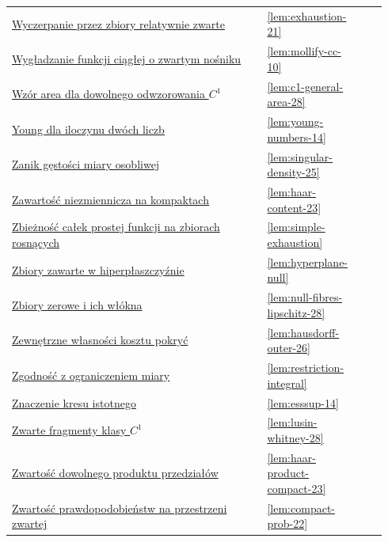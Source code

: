 \documentclass[11pt,a4paper,oneside]{book}
\numberwithin{equation}{chapter}
\theoremstyle{plain}
\theoremstyle{definition}
\theoremstyle{remark}
\begin{document}
\begin{longtable}{@{}p{0.72\linewidth}p{0.135\linewidth}p{0.08\linewidth}@{}}
\hyperref[lem:exhaustion-21]{Wyczerpanie przez zbiory relatywnie zwarte} & \ref*{lem:exhaustion-21} & \pageref*{lem:exhaustion-21} \\
\hyperref[lem:mollify-cc-10]{Wygładzanie funkcji ciągłej o zwartym nośniku} & \ref*{lem:mollify-cc-10} & \pageref*{lem:mollify-cc-10} \\
\hyperref[lem:c1-general-area-28]{Wzór area dla dowolnego odwzorowania $C^1$} & \ref*{lem:c1-general-area-28} & \pageref*{lem:c1-general-area-28} \\
\hyperref[lem:young-numbers-14]{Young dla iloczynu dwóch liczb} & \ref*{lem:young-numbers-14} & \pageref*{lem:young-numbers-14} \\
\hyperref[lem:singular-density-25]{Zanik gęstości miary osobliwej} & \ref*{lem:singular-density-25} & \pageref*{lem:singular-density-25} \\
\hyperref[lem:haar-content-23]{Zawartość niezmiennicza na kompaktach} & \ref*{lem:haar-content-23} & \pageref*{lem:haar-content-23} \\
\hyperref[lem:simple-exhaustion]{Zbieżność całek prostej funkcji na zbiorach rosnących} & \ref*{lem:simple-exhaustion} & \pageref*{lem:simple-exhaustion} \\
\hyperref[lem:hyperplane-null]{Zbiory zawarte w hiperpłaszczyźnie} & \ref*{lem:hyperplane-null} & \pageref*{lem:hyperplane-null} \\
\hyperref[lem:null-fibres-lipschitz-28]{Zbiory zerowe i ich włókna} & \ref*{lem:null-fibres-lipschitz-28} & \pageref*{lem:null-fibres-lipschitz-28} \\
\hyperref[lem:hausdorff-outer-26]{Zewnętrzne własności kosztu pokryć} & \ref*{lem:hausdorff-outer-26} & \pageref*{lem:hausdorff-outer-26} \\
\hyperref[lem:restriction-integral]{Zgodność z ograniczeniem miary} & \ref*{lem:restriction-integral} & \pageref*{lem:restriction-integral} \\
\hyperref[lem:esssup-14]{Znaczenie kresu istotnego} & \ref*{lem:esssup-14} & \pageref*{lem:esssup-14} \\
\hyperref[lem:lusin-whitney-28]{Zwarte fragmenty klasy $C^1$} & \ref*{lem:lusin-whitney-28} & \pageref*{lem:lusin-whitney-28} \\
\hyperref[lem:haar-product-compact-23]{Zwartość dowolnego produktu przedziałów} & \ref*{lem:haar-product-compact-23} & \pageref*{lem:haar-product-compact-23} \\
\hyperref[lem:compact-prob-22]{Zwartość prawdopodobieństw na przestrzeni zwartej} & \ref*{lem:compact-prob-22} & \pageref*{lem:compact-prob-22} \\
\end{longtable}
\endgroup
\end{document}
